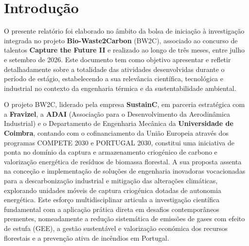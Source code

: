 \section{Introdução}
\label{sec:introducao}

O presente relatório foi elaborado no âmbito da bolsa de iniciação à investigação integrada no projeto \textbf{Bio-Waste2Carbon} (BW2C), associado ao concurso de talentos \textbf{Capture the Future II} e realizado ao longo de três meses, entre julho e setembro de 2026. Este documento tem como objetivo apresentar e refletir detalhadamente sobre a totalidade das atividades desenvolvidas durante o período de estágio, estabelecendo a sua relevância científica, tecnológica e industrial no contexto da engenharia térmica e da sustentabilidade ambiental.

O projeto BW2C, liderado pela empresa \textbf{SustainC}, em parceria estratégica com a \textbf{Fravizel}, a \textbf{ADAI} (Associação para o Desenvolvimento da Aerodinâmica Industrial) e o Departamento de Engenharia Mecânica da \textbf{Universidade de Coimbra}, contando com o cofinanciamento da União Europeia através dos programas COMPETE 2030 e PORTUGAL 2030, constitui uma iniciativa de ponta no domínio da captura e armazenamento criogénico de carbono e valorização energética de resíduos de biomassa florestal. A sua proposta assenta na conceção e implementação de soluções de engenharia inovadoras vocacionadas para a descarbonização industrial e mitigação das alterações climáticas, explorando unidades móveis de captura criogénica dotadas de autonomia energética. Este esforço multidisciplinar articula a investigação científica fundamental com a aplicação prática direta em desafios contemporâneos prementes, nomeadamente a redução sistemática de emissões de gases com efeito de estufa (GEE), a gestão sustentável e valorização económica dos recursos florestais e a prevenção ativa de incêndios em Portugal.

